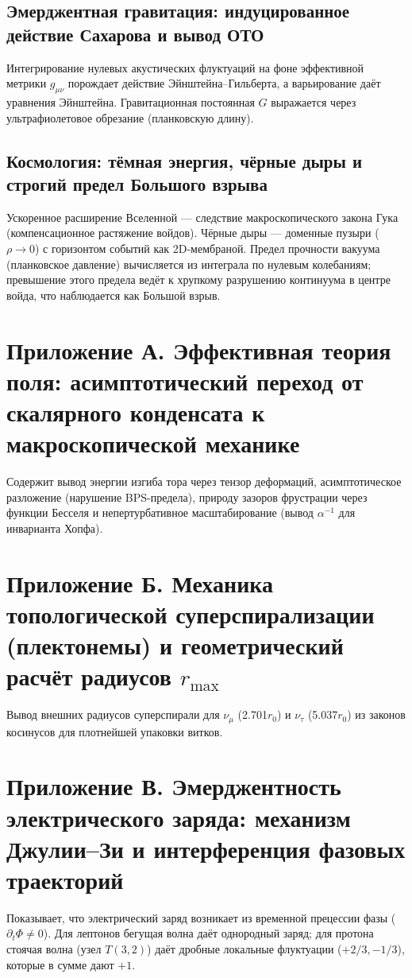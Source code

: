 \documentclass[11pt,a4paper]{article}
\begin{document}
	\subsection{Эмерджентная гравитация: индуцированное действие Сахарова и вывод ОТО}
	Интегрирование нулевых акустических флуктуаций на фоне эффективной метрики $g_{\mu\nu}$ порождает действие Эйнштейна–Гильберта, а варьирование даёт уравнения Эйнштейна. Гравитационная постоянная $G$ выражается через ультрафиолетовое обрезание (планковскую длину).
	
	\subsection{Космология: тёмная энергия, чёрные дыры и строгий предел Большого взрыва}
	Ускоренное расширение Вселенной — следствие макроскопического закона Гука (компенсационное растяжение войдов). Чёрные дыры — доменные пузыри ($\rho\to0$) с горизонтом событий как 2D-мембраной. Предел прочности вакуума (планковское давление) вычисляется из интеграла по нулевым колебаниям; превышение этого предела ведёт к хрупкому разрушению континуума в центре войда, что наблюдается как Большой взрыв.
	
	\section*{Приложение А. Эффективная теория поля: асимптотический переход от скалярного конденсата к макроскопической механике}
	Содержит вывод энергии изгиба тора через тензор деформаций, асимптотическое разложение (нарушение BPS-предела), природу зазоров фрустрации через функции Бесселя и непертурбативное масштабирование (вывод $\alpha^{-1}$ для инварианта Хопфа).
	
	\section*{Приложение Б. Механика топологической суперспирализации (плектонемы) и геометрический расчёт радиусов $r_{\text{max}}$}
	Вывод внешних радиусов суперспирали для $\nu_\mu$ (2.701$r_0$) и $\nu_\tau$ (5.037$r_0$) из законов косинусов для плотнейшей упаковки витков.
	
	\section*{Приложение В. Эмерджентность электрического заряда: механизм Джулии–Зи и интерференция фазовых траекторий}
	Показывает, что электрический заряд возникает из временной прецессии фазы ($\partial_t\Phi\neq0$). Для лептонов бегущая волна даёт однородный заряд; для протона стоячая волна (узел $T(3,2)$) даёт дробные локальные флуктуации ($+2/3,-1/3$), которые в сумме дают $+1$.
	
\end{document}
